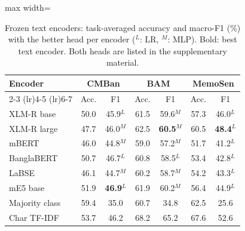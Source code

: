 \begin{table}[t]
\centering
\small
\caption{Frozen text encoders: task-averaged accuracy and macro-F1 (\%) with the better head per encoder ($^{L}$: LR, $^{M}$: MLP). Bold: best text encoder. Both heads are listed in the supplementary material.}
\label{tab:conf_text}
\begin{adjustbox}{max width=\columnwidth}
\begin{tabular}{lcccccc}
\toprule
Encoder & \multicolumn{2}{c}{CMBan} & \multicolumn{2}{c}{BAM} & \multicolumn{2}{c}{MemoSen} \\
\cmidrule(lr){2-3} \cmidrule(lr){4-5} \cmidrule(lr){6-7}
 & Acc. & F1 & Acc. & F1 & Acc. & F1 \\
\midrule
XLM-R base & 50.0 & 45.9$^{L}$ & 61.5 & 59.6$^{M}$ & 57.3 & 46.0$^{L}$ \\
XLM-R large & 47.7 & 46.0$^{M}$ & 62.5 & \textbf{60.5}$^{M}$ & 60.5 & \textbf{48.4}$^{L}$ \\
mBERT & 46.0 & 44.8$^{M}$ & 59.0 & 57.2$^{M}$ & 51.7 & 41.2$^{L}$ \\
BanglaBERT & 50.7 & 46.7$^{L}$ & 60.8 & 58.5$^{L}$ & 53.4 & 42.8$^{L}$ \\
LaBSE & 46.1 & 44.7$^{M}$ & 60.2 & 58.7$^{M}$ & 54.2 & 43.3$^{L}$ \\
mE5 base & 51.9 & \textbf{46.9}$^{L}$ & 61.9 & 60.2$^{M}$ & 56.4 & 44.9$^{L}$ \\
\midrule
Majority class & 59.4 & 35.0 & 60.7 & 34.8 & 62.5 & 25.6 \\
Char TF-IDF & 53.7 & 46.2 & 68.2 & 65.2 & 67.6 & 52.6 \\
\bottomrule
\end{tabular}
\end{adjustbox}
\end{table}
